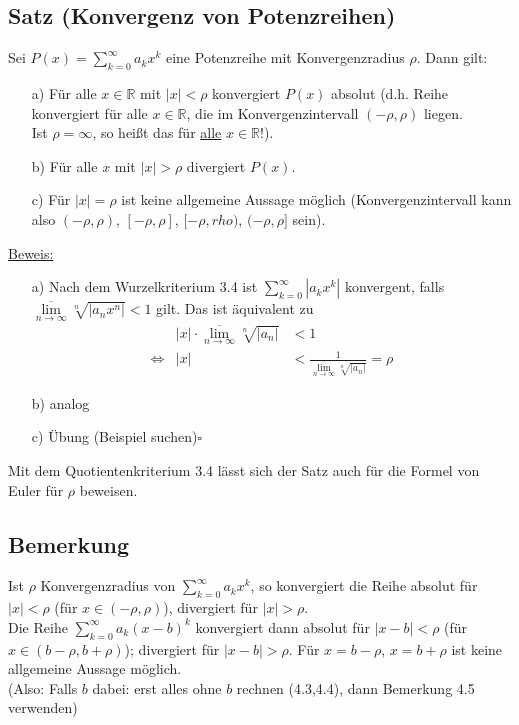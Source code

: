 \documentclass[12pt, titlepage]{article}
\newcommand{\R}{\mathds{R}}
\newcommand{\infn}{n\rightarrow\infty}
\renewcommand{\*}{\cdot}
\renewcommand{\limsup}[1]{\underset{#1}{\overline{\lim}}}
\begin{document}
	\subsection{Satz (Konvergenz von Potenzreihen)}
	Sei $P(x)=\sum_{k=0}^{\infty}a_kx^k$ eine Potenzreihe mit Konvergenzradius $\rho$. Dann gilt:
	\begin{itemize}
		\item[a)] Für alle $x\in\R$ mit $|x|<\rho$ konvergiert $P(x)$ absolut (d.h. Reihe konvergiert für alle $x\in\R$, die im Konvergenzintervall $(-\rho,\rho)$ liegen.\\
		Ist $\rho=\infty$, so heißt das für \underline{alle} $x\in\R$!).
		\item[b)] Für alle $x$ mit $|x|>\rho$ divergiert $P(x)$.
		\item[c)] Für $|x|=\rho$ ist keine allgemeine Aussage möglich (Konvergenzintervall kann also $(-\rho,\rho)$, $[-\rho,\rho]$, $[-\rho,rho)$, $(-\rho,\rho]$ sein).
	\end{itemize}
	\underline{Beweis:}
	\begin{itemize}
		\item[a)] Nach dem Wurzelkriterium 3.4  ist $\sum_{k=0}^{\infty}|a_kx^k|$ konvergent, falls $\limsup{\infn}\sqrt[n]{|a_nx^n|}<1$ gilt. Das ist äquivalent zu
		\begin{align*}
			&|x|\*\limsup{\infn}\sqrt[n]{|a_n|}&<1\\
			\Leftrightarrow&|x|&<\frac{1}{\limsup{\infn}\sqrt[n]{|a_n|}}=\rho
		\end{align*}
		\item[b)] analog
		\item[c)] Übung (Beispiel suchen)\hfill$\square$
	\end{itemize}
	Mit dem Quotientenkriterium 3.4  lässt sich der Satz auch für die Formel von Euler für $\rho$ beweisen.	
	\subsection{Bemerkung}
	Ist $\rho$ Konvergenzradius von $\sum_{k=0}^{\infty}a_kx^k$, so konvergiert die Reihe absolut für $|x|<\rho$ (für $x\in(-\rho,\rho)$), divergiert für $|x|>\rho$.\\
	Die Reihe $\sum_{k=0}^{\infty}a_k(x-b)^k$ konvergiert dann absolut für $|x-b|<\rho$ (für $x\in(b-\rho,b+\rho)$); divergiert für $|x-b|>\rho$. Für $x=b-\rho$, $x=b+\rho$ ist keine allgemeine Aussage möglich.\\
	(Also: Falls $b$ dabei: erst alles ohne $b$ rechnen (4.3,4.4), dann Bemerkung 4.5 verwenden)
\end{document}
